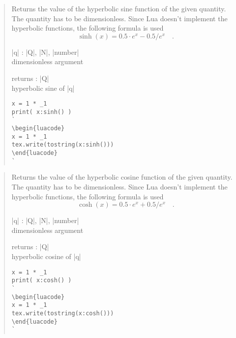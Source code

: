 \documentclass{ltxdoc}
\begin{document}
\begin{quote}
  Returns the value of the hyperbolic sine function of the given quantity. The quantity has to be dimensionless. Since Lua doesn't implement the hyperbolic functions, the following formula is used
  \begin{equation*}
    \sinh(x) = 0.5 \cdot e^x - 0.5 / e^x  \quad.
  \end{equation*}

  \begin{description}
  \item |q| : |Q|, |N|, |number|\\
    dimensionless argument

  \item returns : |Q|\\
    hyperbolic sine of |q|
  \end{description}


\begin{lstlisting}
x = 1 * _1
print( x:sinh() )
`
\begin{luacode}
x = 1 * _1
tex.write(tostring(x:sinh()))
\end{luacode}
`
\end{lstlisting}

\end{quote}



\begin{quote}
  Returns the value of the hyperbolic cosine function of the given quantity. The quantity has to be dimensionless. Since Lua doesn't implement the hyperbolic functions, the following formula is used
  \begin{equation*}
    \cosh(x) = 0.5 \cdot e^x + 0.5 / e^x  \quad.
  \end{equation*}

  \begin{description}
  \item |q| : |Q|, |N|, |number|\\
    dimensionless argument

  \item returns : |Q|\\
    hyperbolic cosine of |q|
  \end{description}

\begin{lstlisting}
x = 1 * _1
print( x:cosh() )
`
\begin{luacode}
x = 1 * _1
tex.write(tostring(x:cosh()))
\end{luacode}
`
\end{lstlisting}

\end{quote}
\end{document}
